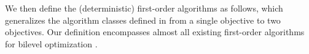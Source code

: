 \documentclass{article}
\begin{document}




We then define the (deterministic) first-order algorithms as follows, which 
generalizes the algorithm classes defined 
in \citep{agarwal2018lower,arjevani2020second,carmon2020lower,arjevani2023lower}
from a single objective to two objectives.
Our definition  
encompasses almost all existing first-order algorithms for bilevel optimization \citep{liu2022bome,shen2023penalty,kwon2023fully,lu2024first}.
\end{document}
